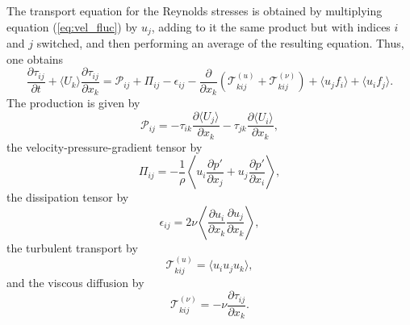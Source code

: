 \documentclass[oneside,a4paper,11pt]{report}
\newcommand{\pfluc}{p'}
\newcommand{\rs}{\tau}          %
\newcommand{\uiavg}{\langle U_i \rangle}
\newcommand{\ujavg}{\langle U_j \rangle}
\newcommand{\ukavg}{\langle U_k \rangle}
\newcommand{\uifluc}{u_i}
\newcommand{\ujfluc}{u_j}
\newcommand{\ukfluc}{u_k}
\begin{document}
The transport equation for the Reynolds stresses is obtained by multiplying equation (\ref{eq:vel_fluc}) by $\ujfluc$, adding to it the same product but with indices $i$ and $j$ switched, and then performing an average of the resulting equation. Thus, one obtains
\begin{equation}
\label{rs_transport}
\frac{\partial \rs_{ij}}{\partial t} + \ukavg \frac{\partial \rs_{ij}}{\partial x_k} = \mathcal{P}_{ij} + \Pi_{ij} - \epsilon_{ij} - \frac{\partial}{\partial x_k} \left ( \mathcal{T}^{(u)}_{kij} + \mathcal{T}^{(\nu)}_{kij} \right ) + \langle \ujfluc f_i \rangle + \langle \uifluc f_j \rangle.
\end{equation}
The production is given by
\begin{equation}
\mathcal{P}_{ij} = -\rs_{ik} \frac{\partial \ujavg}{\partial x_k} - \rs_{jk} \frac{\partial \uiavg}{\partial x_k},
\end{equation}
the velocity-pressure-gradient tensor by
\begin{equation}
\Pi_{ij} = -\frac{1}{\rho} \left \langle \uifluc \frac{\partial \pfluc}{\partial x_j} + \ujfluc \frac{\partial \pfluc}{\partial x_i} \right \rangle,
\end{equation}
the dissipation tensor by
\begin{equation}
\epsilon_{ij} = 2 \nu \left \langle \frac{\partial \uifluc}{\partial x_k}\frac{\partial \ujfluc}{\partial x_k} \right \rangle,
\end{equation}
the turbulent transport by
\begin{equation}
\mathcal{T}^{(u)}_{kij} = \langle \uifluc \ujfluc \ukfluc \rangle,
\end{equation}
and the viscous diffusion by
\begin{equation}
\mathcal{T}^{(\nu)}_{kij} = -\nu \frac{\partial \rs_{ij}}{\partial x_k}.
\end{equation}
\end{document}
